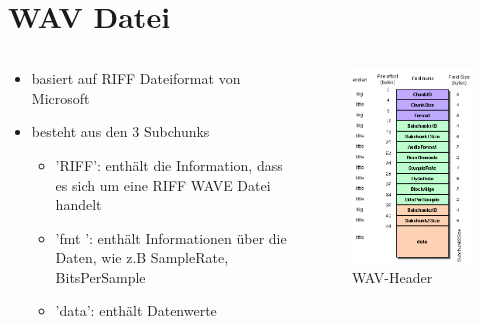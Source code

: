 \section{WAV Datei}
\begin{frame}{\insertsection}
	\begin{columns}[T]
		\begin{column}{0.6\textwidth}
			\vspace{1em}
			\begin{itemize}
				\item basiert auf RIFF Dateiformat von Microsoft
				\item besteht aus den $3$ Subchunks
				\begin{itemize}
					\item 'RIFF': enthält die Information, dass es sich um eine RIFF WAVE Datei handelt \vspace{0.25em}
					\item 'fmt ': enthält Informationen über die Daten, wie z.B SampleRate, BitsPerSample \vspace{0.25em}
					\item 'data': enthält Datenwerte
				\end{itemize}
			\end{itemize}
		\end{column}
		\hfill
		\begin{column}{0.4\textwidth}
			\begin{figure}
				\includegraphics[scale=0.4]{images/wav-header.png}
				\caption{\centering \scriptsize WAV-Header\footnotemark[\thefootnote]}
			\end{figure}
		\end{column}
	\end{columns}
\end{frame}


